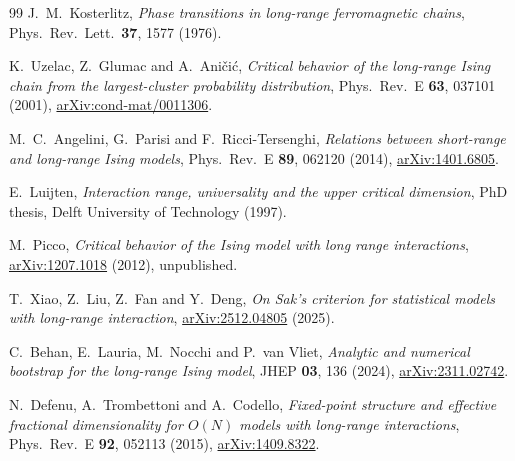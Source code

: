\begin{thebibliography}{99}
J.~M.~Kosterlitz,
\emph{Phase transitions in long-range ferromagnetic chains},
Phys.\ Rev.\ Lett.\ \textbf{37}, 1577 (1976).

K.~Uzelac, Z.~Glumac and A.~Ani\v ci\'c,
\emph{Critical behavior of the long-range Ising chain from the largest-cluster probability
distribution}, Phys.\ Rev.\ E \textbf{63}, 037101 (2001),
\href{https://arxiv.org/abs/cond-mat/0011306}{arXiv:cond-mat/0011306}.

M.~C.~Angelini, G.~Parisi and F.~Ricci-Tersenghi,
\emph{Relations between short-range and long-range Ising models},
Phys.\ Rev.\ E \textbf{89}, 062120 (2014),
\href{https://arxiv.org/abs/1401.6805}{arXiv:1401.6805}.

E.~Luijten, \emph{Interaction range, universality and the upper critical dimension},
PhD thesis, Delft University of Technology (1997).

M.~Picco, \emph{Critical behavior of the Ising model with long range interactions},
\href{https://arxiv.org/abs/1207.1018}{arXiv:1207.1018} (2012), unpublished.

T.~Xiao, Z.~Liu, Z.~Fan and Y.~Deng,
\emph{On Sak's criterion for statistical models with long-range interaction},
\href{https://arxiv.org/abs/2512.04805}{arXiv:2512.04805} (2025).

C.~Behan, E.~Lauria, M.~Nocchi and P.~van Vliet,
\emph{Analytic and numerical bootstrap for the long-range Ising model},
JHEP \textbf{03}, 136 (2024),
\href{https://arxiv.org/abs/2311.02742}{arXiv:2311.02742}.

N.~Defenu, A.~Trombettoni and A.~Codello,
\emph{Fixed-point structure and effective fractional dimensionality for $O(N)$ models with
long-range interactions}, Phys.\ Rev.\ E \textbf{92}, 052113 (2015),
\href{https://arxiv.org/abs/1409.8322}{arXiv:1409.8322}.
\end{thebibliography}
